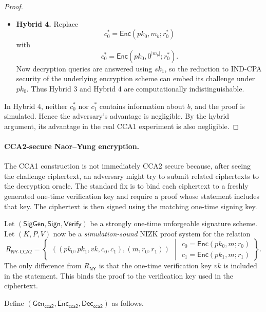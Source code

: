 \begin{proof}
\begin{itemize}
    \item \textbf{Hybrid 4.} Replace
    \[
    c_0^*=\mathsf{Enc}(pk_0,m_b;r_0^*)
    \]
    with
    \[
    c_0^*=\mathsf{Enc}(pk_0,0^{|m_b|};r_0^*).
    \]
    Now decryption queries are answered using $sk_1$, so the reduction to IND-CPA
    security of the underlying encryption scheme can embed its challenge under
    $pk_0$. Thus Hybrid 3 and Hybrid 4 are computationally indistinguishable.
\end{itemize}

In Hybrid 4, neither $c_0^*$ nor $c_1^*$ contains information about $b$, and the
proof is simulated. Hence the adversary's advantage is negligible. By the hybrid
argument, its advantage in the real CCA1 experiment is also negligible.
\end{proof}


\paragraph{CCA2-secure Naor--Yung encryption.}

The CCA1 construction is not immediately CCA2 secure because, after seeing the
challenge ciphertext, an adversary might try to submit related ciphertexts to the
decryption oracle. The standard fix is to bind each ciphertext to a freshly
generated one-time verification key and require a proof whose statement includes
that key. The ciphertext is then signed using the matching one-time signing key.

Let $(\mathsf{SigGen},\mathsf{Sign},\mathsf{Verify})$ be a strongly
one-time unforgeable signature scheme. Let $(K,P,V)$ now be a
\emph{simulation-sound} NIZK proof system for the relation
\[
R_{\mathsf{NY\text{-}CCA2}}
=
\left\{
\begin{array}{c}
((pk_0,pk_1,vk,c_0,c_1),(m,r_0,r_1))
\end{array}
\middle|
\begin{array}{l}
c_0=\mathsf{Enc}(pk_0,m;r_0) \\
c_1=\mathsf{Enc}(pk_1,m;r_1)
\end{array}
\right\}.
\]
The only difference from $R_{\mathsf{NY}}$ is that the one-time verification key
$vk$ is included in the statement. This binds the proof to the verification key
used in the ciphertext.

Define
$(\mathsf{Gen}_{\mathsf{cca2}},\mathsf{Enc}_{\mathsf{cca2}},\mathsf{Dec}_{\mathsf{cca2}})$
as follows.

